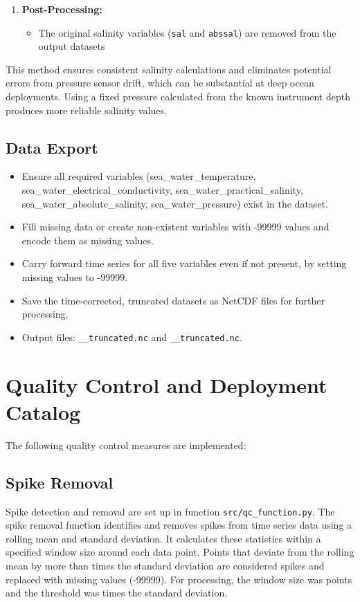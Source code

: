 \begin{enumerate}
    \item \textbf{Post-Processing:}
    \begin{itemize}
        \item The original salinity variables (\texttt{sal} and \texttt{abssal}) are removed from the output datasets
    \end{itemize}
\end{enumerate}

This method ensures consistent salinity calculations and eliminates potential errors from pressure sensor drift, 
which can be substantial at deep ocean deployments. 
Using a fixed pressure calculated from the known instrument depth produces more reliable salinity values.

\subsection{Data Export}

\begin{itemize}
\item Ensure all required variables (sea\_water\_temperature, sea\_water\_electrical\_conductivity, sea\_water\_practical\_salinity, sea\_water\_absolute\_salinity, sea\_water\_pressure) exist in the dataset.
\item Fill missing data or create non-existent variables with -99999 values and encode them as missing values.
\item Carry forward time series for all five variables even if not present, by setting missing values to -99999.
\item Save the time-corrected, truncated datasets as NetCDF files for further processing.
\item Output files: 
\texttt{\projectname\casenumber\_\FirstInstrument\_truncated.nc}
and \texttt{\projectname\casenumber\_\SecondInstrument\_truncated.nc}.
\end{itemize}


\section{Quality Control and Deployment Catalog}
The following quality control measures are implemented:

\subsection{Spike Removal}
Spike detection and removal are set up in function \texttt{src/qc\_function.py}. 
The spike removal function identifies and removes spikes from time series data using a rolling mean and standard deviation. 
It calculates these statistics within a specified window size around each data point. 
Points that deviate from the rolling mean by more than \ThresholdValue{} times the standard deviation are considered spikes and replaced with missing values (-99999). 
For \displayprojectname{} \casenumber{} processing, the window size was \WindowSize{} points and the threshold was \ThresholdValue{} times the standard deviation.

